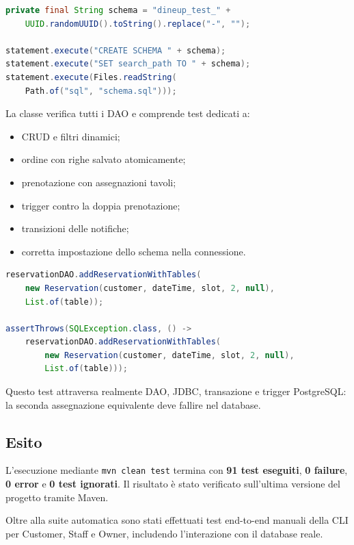 \documentclass[12pt,a4paper]{article}
\newcommand{\code}[1]{\nolinkurl{#1}}
\begin{document}
\begin{lstlisting}[style=codeStyle,language=Java,
caption={Isolamento dei test DAO mediante schema temporaneo.}]
private final String schema = "dineup_test_" +
    UUID.randomUUID().toString().replace("-", "");

statement.execute("CREATE SCHEMA " + schema);
statement.execute("SET search_path TO " + schema);
statement.execute(Files.readString(
    Path.of("sql", "schema.sql")));
\end{lstlisting}

La classe verifica tutti i DAO e comprende test dedicati a:

\begin{itemize}[leftmargin=*]
  \item CRUD e filtri dinamici;
  \item ordine con righe salvato atomicamente;
  \item prenotazione con assegnazioni tavoli;
  \item trigger contro la doppia prenotazione;
  \item transizioni delle notifiche;
  \item corretta impostazione dello schema nella connessione.
\end{itemize}

\begin{lstlisting}[style=codeStyle,language=Java,
caption={Test d'integrazione del trigger anti-doppia prenotazione.}]
reservationDAO.addReservationWithTables(
    new Reservation(customer, dateTime, slot, 2, null),
    List.of(table));

assertThrows(SQLException.class, () ->
    reservationDAO.addReservationWithTables(
        new Reservation(customer, dateTime, slot, 2, null),
        List.of(table)));
\end{lstlisting}

Questo test attraversa realmente DAO, JDBC, transazione e trigger PostgreSQL:
la seconda assegnazione equivalente deve fallire nel database.

\subsection{Esito}

L'esecuzione mediante \code{mvn clean test} termina con \textbf{91 test eseguiti},
\textbf{0 failure}, \textbf{0 error} e \textbf{0 test ignorati}. Il risultato è
stato verificato sull'ultima versione del progetto tramite Maven.

Oltre alla suite automatica sono stati effettuati test end-to-end manuali della
CLI per Customer, Staff e Owner, includendo l'interazione con il database reale.
\end{document}
